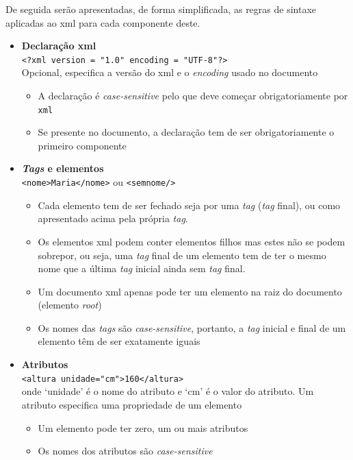 De seguida serão apresentadas, de forma simplificada, as regras de sintaxe aplicadas ao \acrshort{xml} para cada componente deste.

\begin{itemize}
    \item \textbf{Declaração \acrshort{xml}} \\
    \verb|<?xml version = "1.0" encoding = "UTF-8"?>| \\
    Opcional, especifica a versão do \acrshort{xml} e o \textit{encoding} usado no documento
    \begin{itemize}
        \item A declaração é \textit{case-sensitive} pelo que deve começar obrigatoriamente por \texttt{xml}
        \item Se presente no documento, a declaração tem de ser obrigatoriamente o primeiro componente
    \end{itemize}
    \item \textbf{\textit{Tags} e elementos} \\
    \verb|<nome>Maria</nome>| ou \verb|<semnome/>|
    \begin{itemize}
        \item Cada elemento tem de ser fechado seja por uma \textit{tag} (\textit{tag} final), ou como apresentado acima pela própria \textit{tag}.
        \item Os elementos \acrshort{xml} podem conter elementos filhos mas estes não se podem sobrepor, ou seja, uma \textit{tag} final de um elemento tem de ter o mesmo nome que a última \textit{tag} inicial ainda sem \textit{tag} final. 
        \item Um documento \acrshort{xml} apenas pode ter um elemento na raiz do documento (elemento \textit{root})
        \item Os nomes das \textit{tags} são \textit{case-sensitive}, portanto, a \textit{tag} inicial e final de um elemento têm de ser exatamente iguais
    \end{itemize}
    \item \textbf{Atributos} \\
    \verb|<altura unidade="cm">160</altura>| \\
    onde `unidade' é o nome do atributo e `cm' é o valor do atributo. Um atributo especifica uma propriedade de um elemento
    \begin{itemize}
        \item Um elemento pode ter zero, um ou mais atributos
        \item Os nomes dos atributos são \textit{case-sensitive}

\end{itemize}
\end{itemize}

